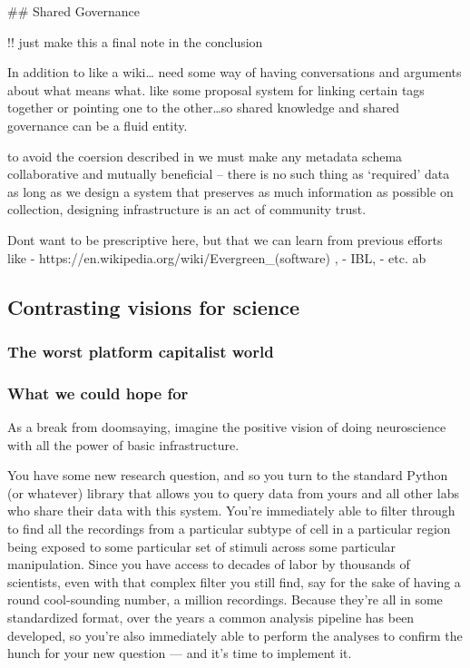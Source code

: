 \documentclass[10pt]{article}
\begin{document}
\begin{multicols}{2}
 \#\# Shared Governance

!! just make this a final note in the conclusion

In addition to like a wiki\ldots{} need some way of having conversations
and arguments about what means what. like some proposal system for
linking certain tags together or pointing one to the other\ldots so
shared knowledge and shared governance can be a fluid entity.

to avoid the coersion described in \cite{bietzCollaborationMetagenomicsSequence2009}  we must make any
metadata schema collaborative and mutually beneficial -- there is no
such thing as `required' data as long as we design a system that
preserves as much information as possible on collection, designing
infrastructure is an act of community trust.

Dont want to be prescriptive here, but that we can learn from previous
efforts like - https://en.wikipedia.org/wiki/Evergreen\_(software) , -
IBL, - etc. ab

\hypertarget{contrasting-visions-for-science}{%
\subsection{Contrasting visions for
science}\label{contrasting-visions-for-science}}

\hypertarget{the-worst-platform-capitalist-world}{%
\subsubsection{The worst platform capitalist
world}\label{the-worst-platform-capitalist-world}}

\hypertarget{what-we-could-hope-for}{%
\subsubsection{What we could hope for}\label{what-we-could-hope-for}}

As a break from doomsaying, imagine the positive vision of doing
neuroscience with all the power of basic infrastructure.

You have some new research question, and so you turn to the standard
Python (or whatever) library that allows you to query data from yours
and all other labs who share their data with this system. You're
immediately able to filter through to find all the recordings from a
particular subtype of cell in a particular region being exposed to some
particular set of stimuli across some particular manipulation. Since you
have access to decades of labor by thousands of scientists, even with
that complex filter you still find, say for the sake of having a round
cool-sounding number, a million recordings. Because they're all in some
standardized format, over the years a common analysis pipeline has been
developed, so you're also immediately able to perform the analyses to
confirm the hunch for your new question --- and it's time to implement
it.


\end{multicols}
\end{document}

